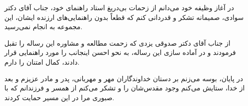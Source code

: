 در آغاز وظیفه‌  خود  می‌دانم از زحمات بی‌دریغ استاد  راهنمای خود،  جناب آقای دکتر  سوادی، صمیمانه تشکر
و  قدردانی کنم  که قطعاً بدون 
راهنمایی‌های ارزنده‌  ایشان، این مجموعه  به انجام  نمی‌رسید.

از جناب  آقای  دکتر صدوقی یزدی که زحمت  مطالعه و مشاوره‌  این رساله
را تقبل  فرمودند و
در آماده سازی  این رساله، به نحو احسن اینجانب را مورد راهنمایی قرار دادند، کمال امتنان را دارم.

در پایان، بوسه می‌زنم بر دستان خداوندگاران مهر و مهربانی، پدر و مادر عزیزم و بعد از خدا، ستایش می‌کنم وجود مقدس‌شان را و تشکر می‌کنم از همسر و فرزندانم که با صبوری مرا در این مسیر حمایت کردند.

\newpage\clearpage
